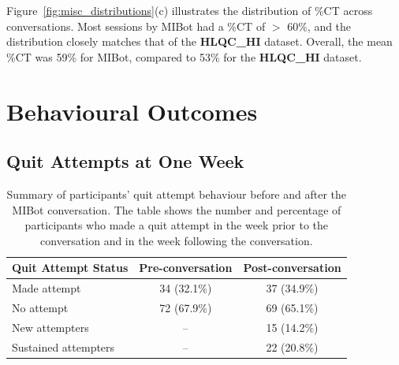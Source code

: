 Figure~\ref{fig:misc_distributions}(c) illustrates the distribution of \%CT across conversations. Most sessions by MIBot had a \%CT of $>$ 60\%, and the distribution closely matches that of the \textbf{HLQC\_HI} dataset. Overall, the mean \%CT was 59\% for MIBot, compared to 53\% for the \textbf{HLQC\_HI} dataset.


































\section{Behavioural Outcomes}


\label{sec:behavioural-outcomes}

\subsection{Quit Attempts at One Week}

\begin{table}[ht]
  \centering
  \small
  \setlength{\tabcolsep}{4pt}
  \renewcommand{\arraystretch}{1.1}
  \begin{tabular}{@{}lcc@{}}
    \toprule
    \textbf{Quit Attempt Status} & \textbf{Pre-conversation} & \textbf{Post-conversation} \\
    \midrule
    Made attempt & 34 (32.1\%) & 37 (34.9\%) \\
    No attempt & 72 (67.9\%) & 69 (65.1\%) \\
    \midrule
    New attempters & -- & 15 (14.2\%) \\
    Sustained attempters & -- & 22 (20.8\%) \\
    \bottomrule
  \end{tabular}
  \caption[Quit Attempt Behaviour Before and After MIBot]{Summary of participants' quit attempt behaviour before and after the MIBot conversation. The table shows the number and percentage of participants who made a quit attempt in the week prior to the conversation and in the week following the conversation.}
  \label{table:quit_attempts}
\end{table}

